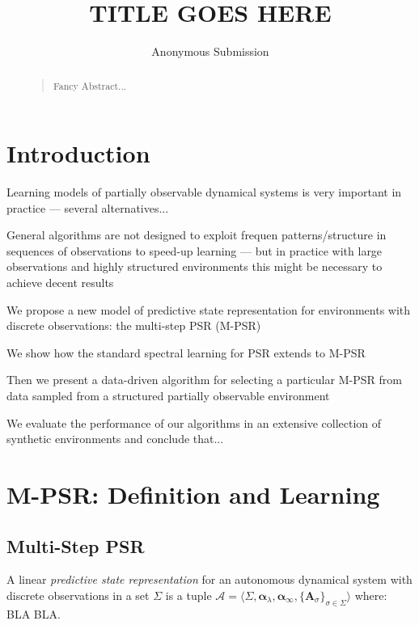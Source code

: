 \documentclass[letterpaper]{article}
\newcommand{\mat}[1]{\mathbf{#1}}
\newcommand{\A}{\mat{A}}
\newcommand{\aone}{\boldsymbol{\alpha}_\lambda}
\newcommand{\ainf}{\boldsymbol{\alpha}_{\infty}}
\newcommand{\psrA}{\mathcal{A}}
\newcommand{\psrsigma}{\langle \Sigma, \aone, \ainf, \{\A_\sigma\}_{\sigma \in \Sigma} \rangle}
\begin{document}
\title{TITLE GOES HERE}
\author{Anonymous Submission}
\maketitle

\begin{abstract}
\begin{quote}
Fancy Abstract...
\end{quote}
\end{abstract}

\section{Introduction}

Learning models of partially observable dynamical systems is very important in practice --- several alternatives...

General algorithms are not designed to exploit frequen patterns/structure in sequences of observations to speed-up learning --- but in practice with large observations and highly structured environments this might be necessary to achieve decent results

We propose a new model of predictive state representation for environments with discrete observations: the multi-step PSR (M-PSR)

We show how the standard spectral learning for PSR extends to M-PSR

Then we present a data-driven algorithm for selecting a particular M-PSR from data sampled from a structured partially observable environment

We evaluate the performance of our algorithms in an extensive collection of synthetic environments and conclude that...

\section{M-PSR: Definition and Learning}

\subsection{Multi-Step PSR}

A linear \emph{predictive state representation} for an autonomous dynamical system with discrete observations in a set $\Sigma$ is a tuple $\psrA = \psrsigma$ where: BLA BLA.
\end{document}
